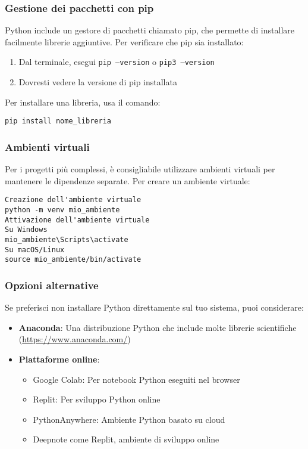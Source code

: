 \subsubsection{Gestione dei pacchetti con pip}
Python include un gestore di pacchetti chiamato pip, che permette di installare facilmente librerie aggiuntive. Per verificare che pip sia installato:
\begin{enumerate}
\item Dal terminale, esegui \texttt{pip --version} o \texttt{pip3 --version}
\item Dovresti vedere la versione di pip installata
\end{enumerate}
Per installare una libreria, usa il comando:
\begin{lstlisting}
pip install nome_libreria
\end{lstlisting}
\subsubsection{Ambienti virtuali}
Per i progetti più complessi, è consigliabile utilizzare ambienti virtuali per mantenere le dipendenze separate. Per creare un ambiente virtuale:
\begin{lstlisting}
Creazione dell'ambiente virtuale
python -m venv mio_ambiente
Attivazione dell'ambiente virtuale
Su Windows
mio_ambiente\Scripts\activate
Su macOS/Linux
source mio_ambiente/bin/activate
\end{lstlisting}
\subsubsection{Opzioni alternative}
Se preferisci non installare Python direttamente sul tuo sistema, puoi considerare:
\begin{itemize}
\item \textbf{Anaconda}: Una distribuzione Python che include molte librerie scientifiche (\url{https://www.anaconda.com/})
\item \textbf{Piattaforme online}:
\begin{itemize}
\item Google Colab: Per notebook Python eseguiti nel browser
\item Replit: Per sviluppo Python online
\item PythonAnywhere: Ambiente Python basato su cloud
\item Deepnote come Replit, ambiente di sviluppo online
\end{itemize}
\end{itemize}

